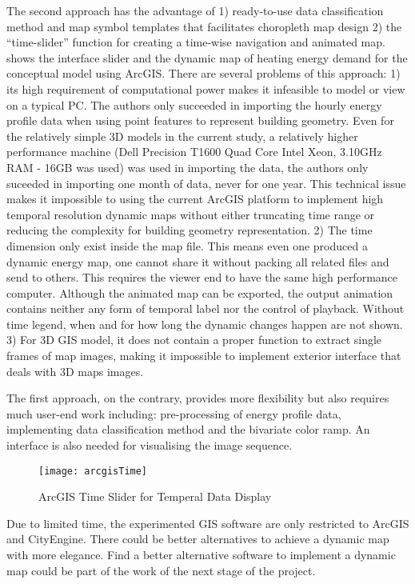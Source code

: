 The second approach has the advantage of 1) ready-to-use data
classification method and map symbol templates that facilitates
choropleth map design 2) the ``time-slider'' function for creating a
time-wise navigation and animated map.  shows the
interface slider and the dynamic map of heating energy demand for the
conceptual model using ArcGIS. There are several problems of this
approach: 1) its high requirement of computational power makes it
infeasible to model or view on a typical PC. The authors only
succeeded in importing the hourly energy profile data when using point
features to represent building geometry. Even for the relatively
simple 3D models in the current study, a relatively higher performance
machine (Dell Precision T1600 Quad Core Intel Xeon, 3.10GHz RAM - 16GB
was used) was used in importing the data, the authors only suceeded in
importing one month of data, never for one year. This technical issue
makes it impossible to using the current ArcGIS platform to implement
high temporal resolution dynamic maps without either truncating time
range or reducing the complexity for building geometry
representation. 2) The time dimension only exist inside the map
file. This means even one produced a dynamic energy map, one cannot
share it without packing all related files and send to others. This
requires the viewer end to have the same high performance
computer. Although the animated map can be exported, the output
animation contains neither any form of temporal label nor the control
of playback. Without time legend, when and for how long the dynamic
changes happen are not shown. 3) For 3D GIS model, it does not contain
a proper function to extract single frames of map images, making it
impossible to implement exterior interface that deals with 3D maps
images.

The first approach, on the contrary, provides more flexibility but
also requires much user-end work including: pre-processing of energy
profile data, implementing data classification method and the
bivariate color ramp. An interface is also needed for visualising the
image sequence.

\begin{figure}[h!]
  \centering
  \texttt{[image: arcgisTime]}
  \caption{ArcGIS Time Slider for Temperal Data Display}
  \label{fig:arcgisTime}
\end{figure}

Due to limited time, the experimented GIS software are only restricted
to ArcGIS and CityEngine. There could be better alternatives to
achieve a dynamic map with more elegance. Find a better alternative
software to implement a dynamic map could be part of the work of the
next stage of the project.
